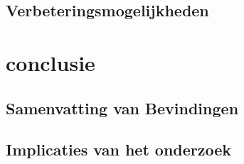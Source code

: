 \subsection{Verbeteringsmogelijkheden}

\section{conclusie}
\subsection{Samenvatting van Bevindingen}
\subsection{Implicaties van het onderzoek}

